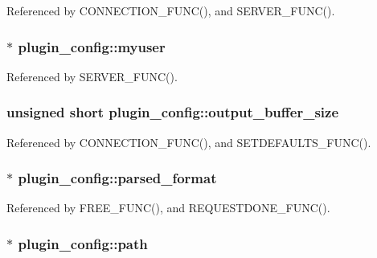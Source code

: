 Referenced by C\-O\-N\-N\-E\-C\-T\-I\-O\-N\-\_\-\-F\-U\-N\-C(), and S\-E\-R\-V\-E\-R\-\_\-\-F\-U\-N\-C().

\hypertarget{structplugin__config_ace25c8155634a17a334190e78bb4249f}{
\subsubsection[{myuser}]{$\ast$ plugin\-\_\-config\-::myuser}}\label{structplugin__config_ace25c8155634a17a334190e78bb4249f}


Referenced by S\-E\-R\-V\-E\-R\-\_\-\-F\-U\-N\-C().

\hypertarget{structplugin__config_a746003a87ec7a397f6a12d4d677de0fe}{
\subsubsection[{output\-\_\-buffer\-\_\-size}]{\setlength{\rightskip}{0pt plus 5cm}unsigned short plugin\-\_\-config\-::output\-\_\-buffer\-\_\-size}}\label{structplugin__config_a746003a87ec7a397f6a12d4d677de0fe}


Referenced by C\-O\-N\-N\-E\-C\-T\-I\-O\-N\-\_\-\-F\-U\-N\-C(), and S\-E\-T\-D\-E\-F\-A\-U\-L\-T\-S\-\_\-\-F\-U\-N\-C().

\hypertarget{structplugin__config_a987497c9c45b892fd54523000650dd8a}{
\subsubsection[{parsed\-\_\-format}]{$\ast$ plugin\-\_\-config\-::parsed\-\_\-format}}\label{structplugin__config_a987497c9c45b892fd54523000650dd8a}


Referenced by F\-R\-E\-E\-\_\-\-F\-U\-N\-C(), and R\-E\-Q\-U\-E\-S\-T\-D\-O\-N\-E\-\_\-\-F\-U\-N\-C().

\hypertarget{structplugin__config_a17b954d56b5f4454890fdad79f59294c}{
\subsubsection[{path}]{$\ast$ plugin\-\_\-config\-::path}}\label{structplugin__config_a17b954d56b5f4454890fdad79f59294c}


